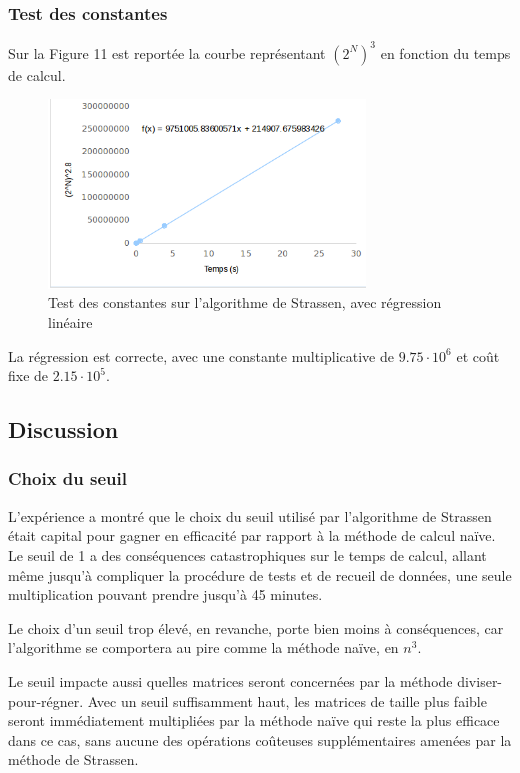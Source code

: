 \documentclass[10pt,a4paper]{article}
\begin{document}
\subsubsection{Test des constantes}

Sur la Figure 11 est reportée la courbe représentant $ (2^{N})^{3} $ en fonction du temps de calcul.

\begin{figure}[h!]
	\centering
	\includegraphics[width=0.75\textwidth]{spreadsheet/graph10}
	\caption{Test des constantes sur l'algorithme de Strassen, avec régression linéaire}
\end{figure}

La régression est correcte, avec une constante multiplicative de $ 9.75 \cdot 10^{6} $ et coût fixe de $ 2.15 \cdot 10^{5} $.

\subsection{Discussion}

\subsubsection{Choix du seuil}

L'expérience a montré que le choix du seuil utilisé par l'algorithme de Strassen était capital pour gagner en efficacité par rapport à la méthode de calcul naïve. Le seuil de 1 a des conséquences catastrophiques sur le temps de calcul, allant même jusqu'à compliquer la procédure de tests et de recueil de données, une seule multiplication pouvant prendre jusqu'à 45 minutes.

Le choix d'un seuil trop élevé, en revanche, porte bien moins à conséquences, car l'algorithme se comportera au pire comme la méthode naïve, en $ n^{3} $.

Le seuil impacte aussi quelles matrices seront concernées par la méthode diviser-pour-régner. Avec un seuil suffisamment haut, les matrices de taille plus faible seront immédiatement multipliées par la méthode naïve qui reste la plus efficace dans ce cas, sans aucune des opérations coûteuses supplémentaires amenées par la méthode de Strassen.
\end{document}
